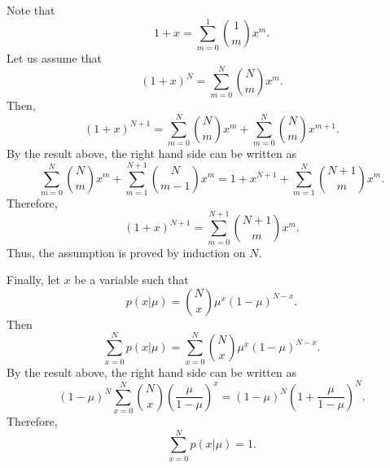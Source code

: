 Note that 
%
\begin{equation}
1 + x = \sum_{m = 0}^{1} {1 \choose m} x ^ m.
\end{equation}
%
Let us assume that 
%
\begin{equation}
(1 + x) ^ N = \sum_{m = 0}^{N} {N \choose m} x ^ m.
\end{equation}
%
Then,
%
\begin{equation}
(1 + x) ^ {N + 1} = \sum_{m = 0}^{N} {N \choose m} x ^ m + \sum_{m = 0}^{N} {N \choose m} x ^ {m + 1}.
\end{equation}
%
By the result above, the right hand side can be written as
%
\begin{equation}
\sum_{m = 0}^{N} {N \choose m} x ^ m + \sum_{m = 1}^{N + 1} {N \choose m - 1} x ^ m = 1 + x ^ {N + 1} + \sum_{m = 1}^{N} {N + 1 \choose m} x ^ m.
\end{equation}
%
Therefore,
%
\begin{equation}
(1 + x) ^ {N + 1} = \sum_{m = 0}^{N + 1} {N + 1 \choose m} x ^ m.
\end{equation}
%
Thus, the assumption is proved by induction on $N$.

Finally, let $x$ be a variable such that
%
\begin{equation}
p(x | \mu) = {N \choose x} \mu ^ x (1 - \mu) ^ {N - x}.
\end{equation}
%
Then
%
\begin{equation}
\sum_{x = 0}^{N} p(x | \mu) = \sum_{x = 0}^{N} {N \choose x} \mu ^ x (1 - \mu) ^ {N - x}.
\end{equation}
%
By the result above, the right hand side can be written as
%
\begin{equation}
(1 - \mu) ^ N \sum_{x = 0}^{N} {N \choose x} \left( \frac{\mu}{1 - \mu} \right) ^ x = (1 - \mu) ^ N \left( 1 + \frac{\mu}{1 - \mu} \right) ^ N.
\end{equation}
%
Therefore,
%
\begin{equation}
\sum_{x = 0}^{N} p(x | \mu) = 1.
\end{equation}
%

































